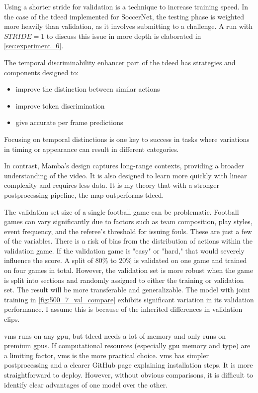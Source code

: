 Using a shorter stride for validation is a technique to increase training speed. In the case of the \acrshort{tdeed} implemented for SoccerNet, the testing phase is weighted more heavily than validation, as it involves submitting to a challenge. A run with \(STRIDE=1\) to discuss this issue in more depth is elaborated in \cref{sec:experiment_6}. 

The temporal discriminability enhancer part of the \acrlong{tdeed} has strategies and components designed to: 
\begin{itemize}
    \item improve the distinction between similar actions
    \item improve token discrimination
    \item give accurate per frame predictions
\end{itemize}

Focusing on temporal distinctions is one key to success in tasks where variations in timing or appearance can result in different categories. 

In contrast, Mamba's design captures long-range contexts, providing a broader understanding of the video. It is also designed to learn more quickly with linear complexity and requires less data. It is my theory that with a stronger postprocessing pipeline, the \acrshort{map} outperforms \acrshort{tdeed}. 

The validation set size of a single football game can be problematic. Football games can vary significantly due to factors such as team composition, play styles, event frequency, and the referee's threshold for issuing fouls. These are just a few of the variables. There is a risk of bias from the distribution of actions within the validation game. If the validation game is "easy" or "hard," that would severely influence the score. A split of 80\% to 20\% is validated on one game and trained on four games in total. However, the validation set is more robust when the game is split into sections and randomly assigned to either the training or validation set. The result will be more transferable and generalizable. The model with joint training in \cref{fig:500_7_val_compare} exhibits significant variation in its validation performance. I assume this is because of the inherited differences in validation clips. 

\acrshort{vms} runs on any \acrshort{gpu}, but \acrshort{tdeed} needs a lot of memory and only runs on premium \acrshort{gpu}s. If computational resources (especially \acrshort{gpu} memory and type) are a limiting factor, \acrshort{vms} is the more practical choice. \acrshort{vms} has simpler postprocessing and a clearer GitHub page explaining installation steps. It is more straightforward to deploy. However, without obvious comparisons, it is difficult to identify clear advantages of one model over the other. 

